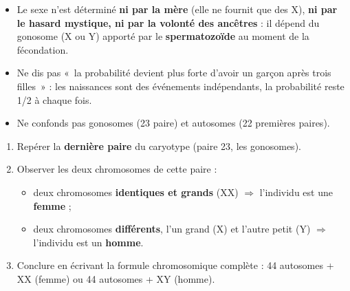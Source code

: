 \documentclass[11pt]{article}
\begin{document}
\begin{attention}
\begin{itemize}
\item Le sexe n'est déterminé \textbf{ni par la mère} (elle ne fournit que des X), \textbf{ni par le hasard mystique, ni par la volonté des ancêtres} : il dépend du gonosome (X ou Y) apporté par le \textbf{spermatozoïde} au moment de la fécondation.
\item Ne dis pas «~la probabilité devient plus forte d'avoir un garçon après trois filles~» : les naissances sont des événements indépendants, la probabilité reste 1/2 à chaque fois.
\item Ne confonds pas gonosomes (23\ieme{} paire) et autosomes (22 premières paires).
\end{itemize}
\end{attention}

\begin{methode}
\begin{enumerate}
\item Repérer la \textbf{dernière paire} du caryotype (paire 23, les gonosomes).
\item Observer les deux chromosomes de cette paire :
\begin{itemize}
\item deux chromosomes \textbf{identiques et grands} (XX) $\Rightarrow$ l'individu est une \textbf{femme} ;
\item deux chromosomes \textbf{différents}, l'un grand (X) et l'autre petit (Y) $\Rightarrow$ l'individu est un \textbf{homme}.
\end{itemize}
\item Conclure en écrivant la formule chromosomique complète : 44 autosomes + XX (femme) ou 44 autosomes + XY (homme).
\end{enumerate}
\end{methode}
\end{document}

